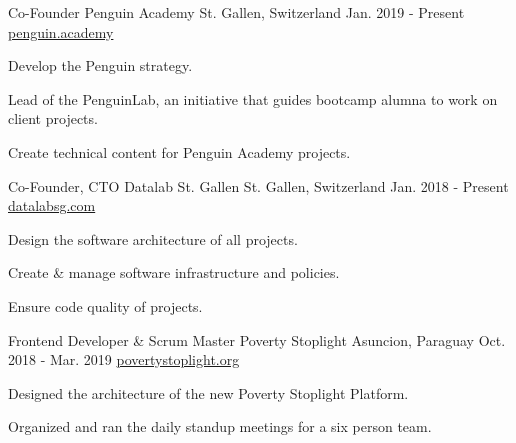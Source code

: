 

\begin{cventries}
  \cventry
    {Co-Founder} %
    {Penguin Academy} %
    {St. Gallen, Switzerland} %
    {Jan. 2019 - Present} %
    {\href{https://penguin.academy}{penguin.academy}} %
    {
      \begin{cvitems} %
      \item {Develop the Penguin strategy.}
      \item {Lead of the PenguinLab, an initiative that guides bootcamp alumna to work on client projects.}
      \item {Create technical content for Penguin Academy projects.}
      \end{cvitems}
    }
  \cventry
    {Co-Founder, CTO} %
    {Datalab St. Gallen} %
    {St. Gallen, Switzerland} %
    {Jan. 2018 - Present} %
    {\href{https://datalabsg.com}{datalabsg.com}} %
    {
      \begin{cvitems} %
      \item {Design the software architecture of all projects.}
      \item {Create \& manage software infrastructure and policies.}
      \item {Ensure code quality of projects.}
      \end{cvitems}
    }
  \cventry
    {Frontend Developer \& Scrum Master} %
    {Poverty Stoplight} %
    {Asuncion, Paraguay} %
    {Oct. 2018 - Mar. 2019} %
    {\href{https://povertystoplight.org}{povertystoplight.org}} %
    {
      \begin{cvitems} %
      \item {Designed the architecture of the new Poverty Stoplight Platform.}
      \item {Organized and ran the daily standup meetings for a six person team.}

\end{cvitems}}
\end{cventries}
